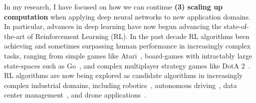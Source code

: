 \documentclass[letterpaper,11pt]{article}
\begin{document}
In my research, I have focused on how we can continue \textbf{(3) scaling up computation} when applying deep neural networks to new application domains.  In particular, advances in deep learning have now begun advancing the state-of-the-art of Reinforcement Learning (RL).
In the past decade RL algorithms been achieving and sometimes surpassing human performance in increasingly complex tasks, ranging from simple games like Atari~\cite{mnih2015human}, board-games with intractably large state-spaces such as Go~\cite{silver2017mastering}, and complex multiplayer strategy games like DotA 2~\cite{OpenAI_dota}.
%
RL algorithms are now being explored as candidate algorithms in increasingly complex industrial domains, including robotics~\cite{brockman2016openai,kober2013reinforcement}, autonomous driving~\cite{dosovitskiy2017carla,sallab2016end}, data center management~\cite{datacenterRL}, and drone applications~\cite{krishnan2019air}.
%
\end{document}
